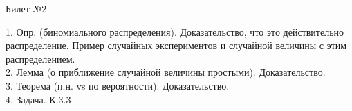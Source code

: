 \documentclass[preview]{standalone}
\begin{document}
 
\begin{center} {\Large Билет №2} \end{center} 

1.  Опр. (биномиального распределения). Доказательство, что это действительно распределение. Пример случайных экспериментов и случайной величины с этим распределением. \\

2.  Лемма (о приближение случайной величины простыми). Доказательство.\\

3.  Теорема (п.н. vs по вероятности). Доказательство.\\

4. Задача. К.3.3\\
\end{document}
